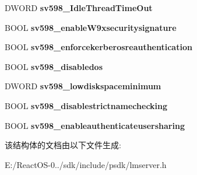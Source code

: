 \begin{DoxyCompactItemize}
D\+W\+O\+RD {\bfseries sv598\+\_\+\+Idle\+Thread\+Time\+Out}
\item 
\mbox{\label{struct___s_e_r_v_e_r___i_n_f_o__598_a2aa58f6cdc0e5160bf8d82dcab12310a}} 
B\+O\+OL {\bfseries sv598\+\_\+enable\+W9xsecuritysignature}
\item 
\mbox{\label{struct___s_e_r_v_e_r___i_n_f_o__598_ab1b63689ffecd146d95409301a340b35}} 
B\+O\+OL {\bfseries sv598\+\_\+enforcekerberosreauthentication}
\item 
\mbox{\label{struct___s_e_r_v_e_r___i_n_f_o__598_aba9b91aeb12cf787644d35d85afdeaa2}} 
B\+O\+OL {\bfseries sv598\+\_\+disabledos}
\item 
\mbox{\label{struct___s_e_r_v_e_r___i_n_f_o__598_a091eedb90a5b53a53b520fdb9edb1b3f}} 
D\+W\+O\+RD {\bfseries sv598\+\_\+lowdiskspaceminimum}
\item 
\mbox{\label{struct___s_e_r_v_e_r___i_n_f_o__598_a0beda238318a676cb23c08009bc88f0c}} 
B\+O\+OL {\bfseries sv598\+\_\+disablestrictnamechecking}
\item 
\mbox{\label{struct___s_e_r_v_e_r___i_n_f_o__598_a58a3607bf791d8d8a6275f118d3fd83d}} 
B\+O\+OL {\bfseries sv598\+\_\+enableauthenticateusersharing}
\end{DoxyCompactItemize}


该结构体的文档由以下文件生成\+:\begin{DoxyCompactItemize}
\item 
E\+:/\+React\+O\+S-\/0../sdk/include/psdk/lmserver.\+h\end{DoxyCompactItemize}
